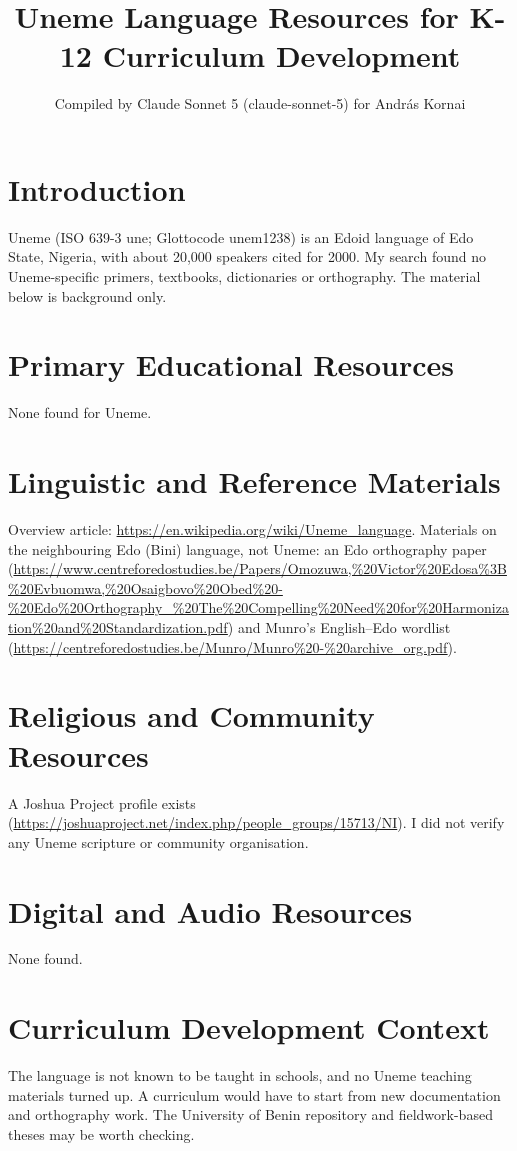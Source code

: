 \documentclass[12pt]{article}
\title{Uneme Language Resources for K-12 Curriculum Development}
\author{Compiled by Claude Sonnet 5 (claude-sonnet-5) for Andr\'as Kornai}
\date{}
\begin{document}
\maketitle
\section{Introduction}
Uneme (ISO 639-3 une; Glottocode unem1238) is an Edoid language of Edo State, Nigeria, with about 20,000 speakers cited for 2000. My search found no Uneme-specific primers, textbooks, dictionaries or orthography. The material below is background only.
\section{Primary Educational Resources}
None found for Uneme.
\section{Linguistic and Reference Materials}
Overview article: \url{https://en.wikipedia.org/wiki/Uneme_language}. Materials on the neighbouring Edo (Bini) language, not Uneme: an Edo orthography paper (\url{https://www.centreforedostudies.be/Papers/Omozuwa,%20Victor%20Edosa%3B%20Evbuomwa,%20Osaigbovo%20Obed%20-%20Edo%20Orthography_%20The%20Compelling%20Need%20for%20Harmonization%20and%20Standardization.pdf}) and Munro's English--Edo wordlist (\url{https://centreforedostudies.be/Munro/Munro%20-%20archive_org.pdf}).
\section{Religious and Community Resources}
A Joshua Project profile exists (\url{https://joshuaproject.net/index.php/people_groups/15713/NI}). I did not verify any Uneme scripture or community organisation.
\section{Digital and Audio Resources}
None found.
\section{Curriculum Development Context}
The language is not known to be taught in schools, and no Uneme teaching materials turned up. A curriculum would have to start from new documentation and orthography work. The University of Benin repository and fieldwork-based theses may be worth checking.
\end{document}
